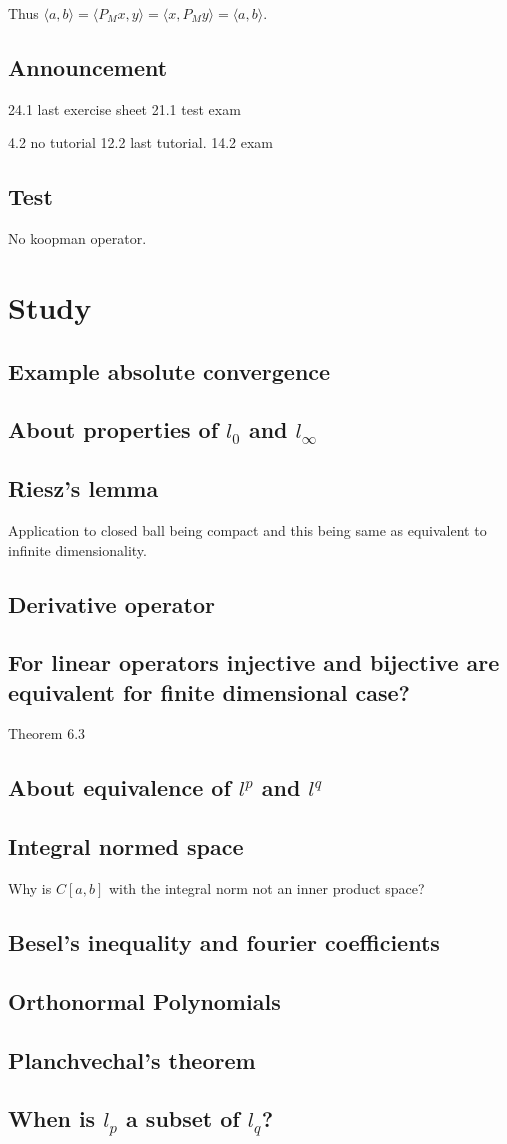 \documentclass[11pt]{article}
\begin{document}
Thus \(\langle a, b \rangle = \langle P_M x, y \rangle = \langle x, P_M y
    \rangle = \langle a, b\rangle\).
\subsection{Announcement}
\label{sec:org8edffc5}
24.1 last exercise sheet
21.1 test exam

4.2 no tutorial
12.2 last tutorial.
14.2 exam
\subsection{Test}
\label{sec:orge7749a9}
No koopman operator.
\section{Study}
\label{sec:org86963db}
\subsection{Example absolute convergence}
\label{sec:org27ca271}
\subsection{About properties of \(l_0\) and \(l_\infty\)}
\label{sec:org5869b28}
\subsection{Riesz's lemma}
\label{sec:orgfde748d}
Application to closed ball being compact and this being same as equivalent to
infinite dimensionality.
\subsection{Derivative operator}
\label{sec:orga483d5e}
\subsection{For linear operators injective and bijective are equivalent for finite dimensional case?}
\label{sec:orgcc1b079}
Theorem 6.3
\subsection{About equivalence of \(l^p\) and \(l^q\)}
\label{sec:org13e7ddf}
\subsection{Integral normed space}
\label{sec:org53dbc02}
Why is \(C[a, b]\) with the integral norm not an inner product space?
\subsection{Besel's inequality and fourier coefficients}
\label{sec:orgb01f86f}
\subsection{Orthonormal Polynomials}
\label{sec:org56b694e}
\subsection{Planchvechal's theorem}
\label{sec:org42f60aa}
\subsection{When is \(l_p\) a subset of \(l_q\)?}
\label{sec:orge535a52}
\end{document}
